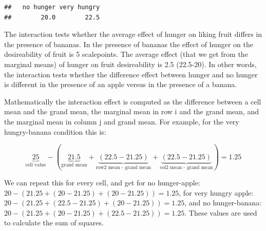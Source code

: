 \documentclass[
]{book}
\begin{document}
\begin{verbatim}
##   no hunger very hungry 
##        20.0        22.5
\end{verbatim}

The interaction tests whether the average effect of hunger on liking fruit differs in the presence of bananas. In the presence of bananas the effect of hunger on the desireability of fruit is 5 scalepoints. The average effect (that we get from the marginal means) of hunger on fruit desireability is 2.5 (22.5-20). In other words, the interaction tests whether the difference effect between hunger and no hunger is different in the presence of an apple versus in the presence of a banana.

Mathematically the interaction effect is computed as the difference between a cell mean and the grand mean, the marginal mean in row i and the grand mean, and the marginal mean in column j and grand mean. For example, for the very hungry-banana condition this is:

\[\underbrace{25}_\text{cell value} - (\underbrace{21.5}_\text{grand mean} + \underbrace{(22.5-21.25)}_\text{row2 mean - grand mean} + \underbrace{(22.5-21.25)}_\text{col2 mean - grand mean}) = 1.25\]

We can repeat this for every cell, and get for no hunger-apple: \(20 - (21.25 + (20-21.25) + (20-21.25)) = 1.25\), for very hungry apple: \(20 - (21.25 + (22.5-21.25) + (20-21.25)) = 1.25\), and no hunger-banana: \(20 - (21.25 + (20-21.25) + (22.5-21.25)) = 1.25\).
These values are used to calculate the sum of squares.
\end{document}
